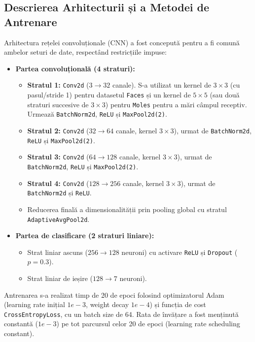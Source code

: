 \documentclass[12pt,a4paper]{article}
\begin{document}
\subsection{Descrierea Arhitecturii și a Metodei de Antrenare}
Arhitectura rețelei convoluționale (CNN) a fost concepută pentru a fi comună ambelor seturi de date, respectând restricțiile impuse:
\begin{itemize}
    \item \textbf{Partea convoluțională (4 straturi):}
    \begin{itemize}
        \item \textbf{Stratul 1:} \texttt{Conv2d} ($3 \rightarrow 32$ canale). S-a utilizat un kernel de $3\times3$ (cu pasul/stride 1) pentru datasetul \texttt{Faces} și un kernel de $5\times5$ (sau două straturi succesive de $3\times3$) pentru \texttt{Moles} pentru a mări câmpul receptiv. Urmează \texttt{BatchNorm2d}, \texttt{ReLU} și \texttt{MaxPool2d(2)}.
        \item \textbf{Stratul 2:} \texttt{Conv2d} ($32 \rightarrow 64$ canale, kernel $3\times3$), urmat de \texttt{BatchNorm2d}, \texttt{ReLU} și \texttt{MaxPool2d(2)}.
        \item \textbf{Stratul 3:} \texttt{Conv2d} ($64 \rightarrow 128$ canale, kernel $3\times3$), urmat de \texttt{BatchNorm2d}, \texttt{ReLU} și \texttt{MaxPool2d(2)}.
        \item \textbf{Stratul 4:} \texttt{Conv2d} ($128 \rightarrow 256$ canale, kernel $3\times3$), urmat de \texttt{BatchNorm2d} și \texttt{ReLU}.
        \item Reducerea finală a dimensionalității prin pooling global cu stratul \texttt{AdaptiveAvgPool2d}.
    \end{itemize}
    \item \textbf{Partea de clasificare (2 straturi liniare):}
    \begin{itemize}
        \item Strat liniar ascuns ($256 \rightarrow 128$ neuroni) cu activare \texttt{ReLU} și \texttt{Dropout} ($p=0.3$).
        \item Strat liniar de ieșire ($128 \rightarrow 7$ neuroni).
    \end{itemize}
\end{itemize}
Antrenarea s-a realizat timp de 20 de epoci folosind optimizatorul Adam (learning rate inițial $1e-3$, weight decay $1e-4$) și funcția de cost \texttt{CrossEntropyLoss}, cu un batch size de 64. Rata de învățare a fost menținută constantă ($1e-3$) pe tot parcursul celor 20 de epoci (learning rate scheduling constant).
\end{document}
